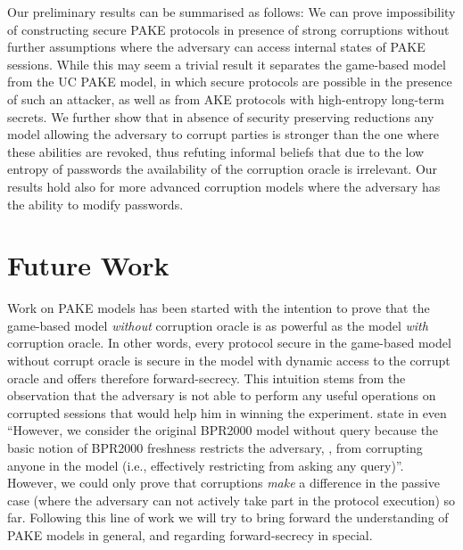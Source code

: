 Our preliminary results can be summarised as follows:
We can prove impossibility of constructing secure \ac{PAKE} protocols in presence of strong corruptions without further assumptions where the adversary can access internal states of \ac{PAKE} sessions.
While this may seem a trivial result it separates the game-based model from the \ac{UC} \ac{PAKE} model, in which secure protocols are possible in the presence of such an attacker, as well as from \ac{AKE} protocols with high-entropy long-term secrets.
We further show that in absence of security preserving reductions any model allowing the adversary to corrupt parties is stronger than the one where these abilities are revoked, thus refuting informal beliefs that due to the low entropy of passwords the availability of the corruption oracle is irrelevant.
Our results hold also for more advanced corruption models where the adversary has the ability to modify passwords.

\section{Future Work}
Work on \ac{PAKE} models has been started with the intention to prove that the game-based model \emph{without} corruption oracle is as powerful as the model \emph{with} corruption oracle.
In other words, every protocol secure in the game-based model without corrupt oracle is secure in the model with dynamic access to the corrupt oracle and offers therefore forward-secrecy.
This intuition stems from the observation that the adversary is not able to perform any useful operations on corrupted sessions that would help him in winning the experiment.
\citeauthor{ChooBH05} state in \cite{ChooBH05} even ``However, we consider the original BPR2000 model without \Corrupt query because the basic notion of BPR2000 freshness restricts the adversary, \cA, from corrupting anyone in the model (i.e., effectively restricting \cA from asking any \Corrupt query)''.
However, we could only prove that corruptions \emph{make} a difference in the passive case (where the adversary can not actively take part in the protocol execution) so far.
Following this line of work we will try to bring forward the understanding of \ac{PAKE} models in general, and regarding forward-secrecy in special.

